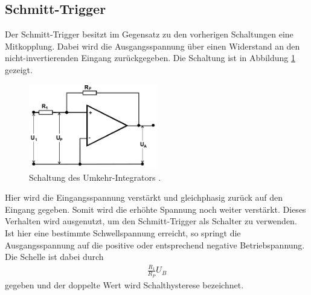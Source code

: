 \subsection{Schmitt-Trigger}
Der Schmitt-Trigger besitzt im Gegensatz zu
den vorherigen Schaltungen eine Mitkopplung. 
Dabei wird die Ausgangsspannung über
einen Widerstand an den nicht-invertierenden
Eingang zurückgegeben. Die Schaltung ist in
Abbildung \ref{pic:schmitt} gezeigt. 
\begin{figure}[t]
 \includegraphics[width = 0.5\textwidth]{../pics/schmitt.png}
 \caption{Schaltung des Umkehr-Integrators \cite{Anl}.}
 \label{pic:schmitt}
\end{figure}
Hier wird die Eingangsspannung 
verstärkt und gleichphasig zurück auf
den Eingang gegeben. Somit wird die erhöhte
Spannung noch weiter verstärkt. Dieses Verhalten 
wird ausgenutzt, um den Schmitt-Trigger
als Schalter zu verwenden. Ist hier eine bestimmte 
Schwellspannung erreicht, so springt
die Ausgangsspannung auf die positive oder
entsprechend negative Betriebspannung. Die
Schelle ist dabei durch
\begin{align}
 \frac{R_1}{R_P} U_B
\end{align}
gegeben und der doppelte Wert wird Schalthysterese bezeichnet.

